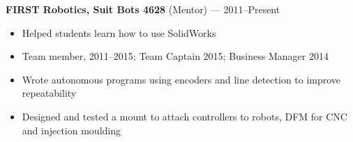 \documentclass[12pt, oneside]{article}
\newcommand{\jobtitle}[2] {
	{\bf #1} {#2} \vspace{-10pt} \\
}
\begin{document}
\begin{flushleft}
\jobtitle{FIRST Robotics, Suit Bots 4628}{(Mentor) — 2011–Present}
\begin{itemize}
	\item Helped students learn how to use SolidWorks \\
	\item Team member, 2011–2015; Team Captain 2015; Business Manager 2014 \\
	\item Wrote autonomous programs using encoders and line detection to improve repeatability \\
	\item Designed and tested a mount to attach controllers to robots, DFM for CNC and injection moulding \\
\end{itemize}\vspace{-7pt}






\end{flushleft}
\end{document}
